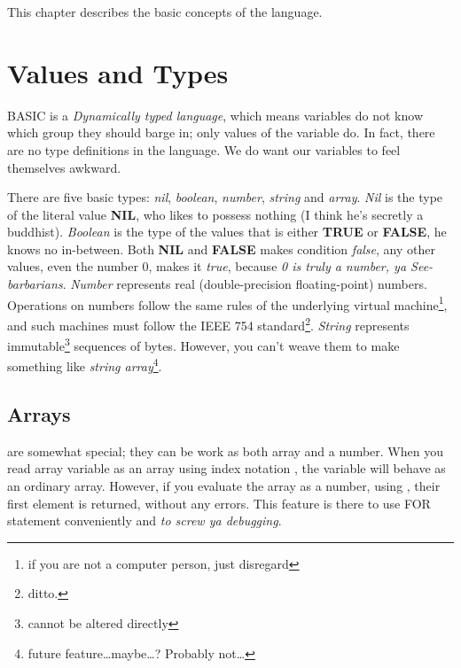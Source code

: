 This chapter describes the basic concepts of the language.


\section{Values and Types}

BASIC is a \emph{Dynamically typed language}, which means variables do not know which group they should barge in; only values of the variable do. In fact, there are no type definitions in the language. We do want our variables to feel themselves awkward.

There are five basic types: \emph{nil}, \emph{boolean}, \emph{number}, \emph{string} and \emph{array}. \emph{Nil} is the type of the literal value \textbf{NIL}, who likes to possess nothing (I think he's secretly a buddhist). \emph{Boolean} is the type of the values that is either \textbf{TRUE} or \textbf{FALSE}, he knows no in-between. Both \textbf{NIL} and \textbf{FALSE} makes condition \emph{false}, any other values, even the number 0, makes it \emph{true}, because \emph{0 is truly a number, ya See-barbarians}. \emph{Number} represents real (double-precision floating-point) numbers. Operations on numbers follow the same rules of the underlying virtual machine\footnote{if you are not a computer person, just disregard}, and such machines must follow the IEEE 754 standard\footnote{ditto.}. \emph{String} represents immutable\footnote{cannot be altered directly} sequences of bytes. However, you can't weave them to make something like \emph{string array}\footnote{future feature\ldots maybe\ldots? Probably not\ldots}.

\subsection{Arrays} are somewhat special; they can be work as both array and a number. When you read array variable as an array using index notation , the variable will behave as an ordinary array. However, if you evaluate the array as a number, using , their first element is returned, without any errors. This feature is there to use FOR statement conveniently and \emph{to screw ya debugging}.